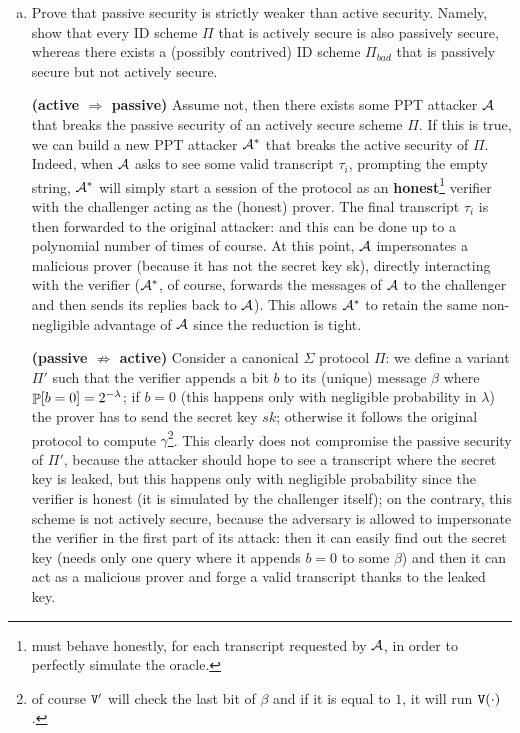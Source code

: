 \begin{enumerate}[(a)]
	\item Prove that passive security is strictly weaker than active security. Namely, show that every ID scheme $\Pi$ that is actively secure is also passively secure, whereas there exists a (possibly contrived) ID scheme $\Pi_{bad}$ that is passively secure but not actively secure.

	      \begin{solution}
		      \textbf{(active $\Rightarrow$ passive)} Assume not, then there exists some PPT attacker $\attacker$ that breaks the passive security of an actively secure scheme $\Pi$. If this is true, we can build a new PPT attacker $\newattacker$ that breaks the active security of $\Pi$. Indeed, when $\attacker$ asks to see some valid transcript $\tau_i$, prompting the empty string, $\newattacker$ will simply start a session of the protocol as an \textbf{honest}\footnote{must behave honestly, for each transcript requested by $\attacker$, in order to perfectly simulate the oracle.} verifier with the challenger acting as the (honest) prover. The final transcript $\tau_i$ is then forwarded to the original attacker: and this can be done up to a polynomial number of times of course. At this point, $\attacker$ impersonates a malicious prover (because it has not the secret key sk), directly interacting with the verifier ($\newattacker$, of course, forwards the messages of $\attacker$ to the challenger and then sends its replies back to $\attacker$). This allows $\newattacker$ to retain the same non-negligible advantage of $\attacker$ since the reduction is tight.

		      \bigskip
		      \textbf{(passive $\not\Rightarrow$ active)} Consider a canonical $\Sigma$ protocol $\Pi$: we define a variant $\Pi'$ such that the verifier appends a bit $b$ to its (unique) message $\beta$ where $\P[b=0] = 2^{-\lambda}$; if $b = 0$ (this happens only with negligible probability in $\lambda$) the prover has to send the secret key $sk$; otherwise it follows the original protocol to compute $\gamma$\footnote{of course $\verifier'$ will check the last bit of $\beta$ and if it is equal to $1$, it will run $\verifier(\cdot)$.}. This clearly does not compromise the passive security of $\Pi'$, because the attacker should hope to see a transcript where the secret key is leaked, but this happens only with negligible probability since the verifier is honest (it is simulated by the challenger itself); on the contrary, this scheme is not actively secure, because the adversary is allowed to impersonate the verifier in the first part of its attack: then it can easily find out the secret key (needs only one query where it appends $b = 0$ to some $\beta$) and then it can act as a malicious prover and forge a valid transcript thanks to the leaked key.
	      \end{solution}


\end{enumerate}
